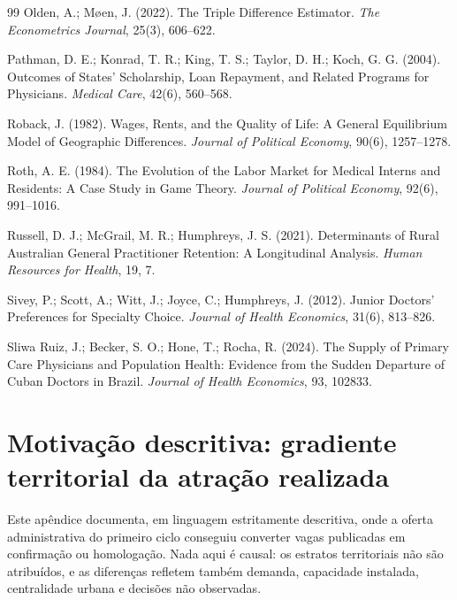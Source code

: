 \documentclass[11pt,a4paper]{article}
\begin{document}
\begin{thebibliography}{99}
Olden, A.; Møen, J. (2022). The Triple Difference Estimator.
\textit{The Econometrics Journal}, 25(3), 606--622.

Pathman, D. E.; Konrad, T. R.; King, T. S.; Taylor, D. H.; Koch, G. G. (2004).
Outcomes of States' Scholarship, Loan Repayment, and Related Programs for
Physicians. \textit{Medical Care}, 42(6), 560--568.

Roback, J. (1982). Wages, Rents, and the Quality of Life: A General Equilibrium
Model of Geographic Differences.
\textit{Journal of Political Economy}, 90(6), 1257--1278.

Roth, A. E. (1984). The Evolution of the Labor Market for Medical Interns and
Residents: A Case Study in Game Theory.
\textit{Journal of Political Economy}, 92(6), 991--1016.

Russell, D. J.; McGrail, M. R.; Humphreys, J. S. (2021). Determinants of Rural
Australian General Practitioner Retention: A Longitudinal Analysis.
\textit{Human Resources for Health}, 19, 7.

Sivey, P.; Scott, A.; Witt, J.; Joyce, C.; Humphreys, J. (2012). Junior
Doctors' Preferences for Specialty Choice.
\textit{Journal of Health Economics}, 31(6), 813--826.

Sliwa Ruiz, J.; Becker, S. O.; Hone, T.; Rocha, R. (2024). The Supply of
Primary Care Physicians and Population Health: Evidence from the Sudden
Departure of Cuban Doctors in Brazil.
\textit{Journal of Health Economics}, 93, 102833.

\end{thebibliography}

\appendix

\section{Motivação descritiva: gradiente territorial da atração realizada}
\label{sec:territorio}

Este apêndice documenta, em linguagem estritamente descritiva, onde a oferta
administrativa do primeiro ciclo conseguiu converter vagas publicadas em
confirmação ou homologação. Nada aqui é causal: os estratos territoriais não são
atribuídos, e as diferenças refletem também demanda, capacidade instalada,
centralidade urbana e decisões não observadas.
\end{document}

